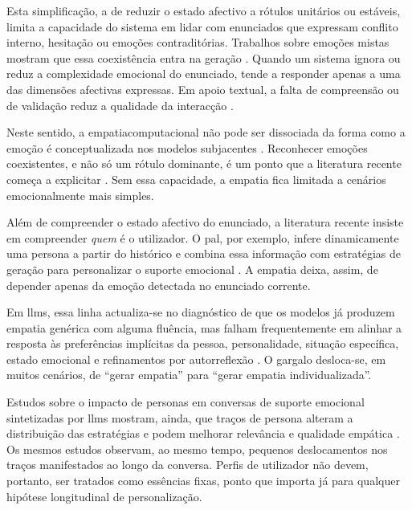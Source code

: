 Esta simplificação, a de reduzir o estado afectivo a rótulos unitários ou estáveis, limita a capacidade do sistema em lidar com enunciados que expressam conflito interno, hesitação ou emoções contraditórias. Trabalhos sobre emoções mistas mostram que essa coexistência entra na geração \parencite{Zhao2026MEGE, Wan2025EmoDynamiX}. Quando um sistema ignora ou reduz a complexidade emocional do enunciado, tende a responder apenas a uma das dimensões afectivas expressas. Em apoio textual, a falta de compreensão ou de validação reduz a qualidade da interacção \parencite{Sharma2020Empathy}.

Neste sentido, a \gls{empatiacomputacional} não pode ser dissociada da forma como a emoção é conceptualizada nos modelos subjacentes \parencite{Sharma2020Empathy, Rashkin2019Empathy}. Reconhecer emoções coexistentes, e não só um rótulo dominante, é um ponto que a literatura recente começa a explicitar \parencite{Zhao2026MEGE, Wan2025EmoDynamiX}. Sem essa capacidade, a empatia fica limitada a cenários emocionalmente mais simples.

Além de compreender o estado afectivo do enunciado, a literatura recente insiste em compreender \textit{quem} é o utilizador. O \gls{pal}, por exemplo, infere dinamicamente uma persona a partir do histórico e combina essa informação com estratégias de geração para personalizar o suporte emocional \parencite{Cheng2023PAL}. A empatia deixa, assim, de depender apenas da emoção detectada no enunciado corrente.

Em \glspl{llm}, essa linha actualiza-se no diagnóstico de que os modelos já produzem empatia genérica com alguma fluência, mas falham frequentemente em alinhar a resposta às preferências implícitas da pessoa, personalidade, situação específica, estado emocional e refinamentos por autorreflexão \parencite{Ye2025GenericPersonalized}. O gargalo desloca-se, em muitos cenários, de ``gerar empatia'' para ``gerar empatia individualizada''.

Estudos sobre o impacto de personas em conversas de suporte emocional sintetizadas por \glspl{llm} mostram, ainda, que traços de persona alteram a distribuição das estratégias e podem melhorar relevância e qualidade empática \parencite{Wu2025PersonasToTalks}. Os mesmos estudos observam, ao mesmo tempo, pequenos deslocamentos nos traços manifestados ao longo da conversa. Perfis de utilizador não devem, portanto, ser tratados como essências fixas, ponto que importa já para qualquer hipótese longitudinal de personalização.

